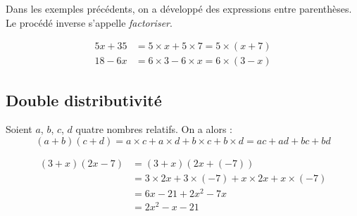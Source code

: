 \documentclass[11pt]{article}
\begin{document}
\begin{remarque}
Dans les exemples précédents, on a développé des expressions entre
parenthèses. Le procédé inverse s'appelle \emph{factoriser}.
\end{remarque}

\begin{exemple}
\begin{align*}
5x + 35 &= 5 \times x + 5 \times 7 = 5 \times (x + 7) \\
18 - 6x &= 6 \times 3 - 6 \times x = 6 \times (3 - x)
\end{align*}
\end{exemple}

\subsection{Double distributivité}

\begin{propriete}
Soient $a$, $b$, $c$, $d$ quatre nombres relatifs. On a alors :
\[ (a + b)(c + d) = a \times c + a \times d + b \times c + b \times d = ac + ad + bc +
bd \]
\end{propriete}

\begin{exemple}
\begin{align*}
(3 + x)(2x - 7) &= (3 + x)(2x + (-7)) \\
&= 3 \times 2x + 3 \times (-7) + x \times 2x + x \times (-7) \\
&= 6x - 21 + 2x^2 - 7x \\
&= 2x^2 - x - 21
\end{align*}
\end{exemple}
\end{document}
